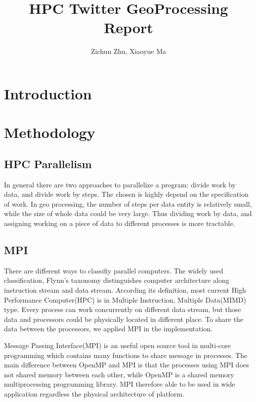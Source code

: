 \documentclass[11pt]{article}
\title{HPC Twitter GeoProcessing Report}
\author
{Zichun Zhu, Xiaoyue Ma}
\begin{document}
\maketitle


\section{Introduction}

\section{Methodology}

\subsection{HPC Parallelism}
In general there are two approaches to parallelize a program: divide work by data, and divide work by steps. The chosen is highly depend on the specification of work. In geo processing, the number of steps per data entity is relatively small, while the size of whole data could be very large. Thus dividing work by data, and assigning working on a piece of data to different processes is more tractable.

\subsection{MPI}
There are different ways to classifiy parallel computers. The widely used classification, Flynn's taxonomy distinguishes computer architecture along instruction stream and data stream. According its definition, most current High Performance Computer(HPC) is in Multiple Instruction, Multiple Data(MIMD) type. Every process can work concurrently on different data stream, but those data and processors could be physically located in different place. To share the data between the processors,  we applied MPI in the implementation.

Message Passing  Interface(MPI) is an useful open source tool in multi-core programming which contains many functions to share message in processes. The main difference between OpenMP and MPI is that the processes using MPI does not shared memory between each other, while OpenMP is a shared memory multiprocessing programming library.  MPI therefore able to be used in wide application regardless the physical architecture of platform.
\end{document}
